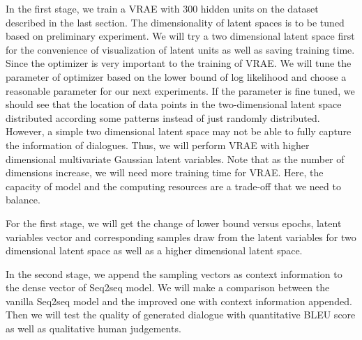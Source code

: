 In the first stage, we train a VRAE with 300 hidden units on the dataset described in the last section. The dimensionality of latent spaces is to be tuned based on preliminary experiment. We will try a two dimensional latent space first for the convenience of visualization of latent units as well as saving training time. Since the optimizer is very important to the training of VRAE. We will tune the parameter of optimizer based on the lower bound of log likelihood and choose a reasonable parameter for our next experiments. If the parameter is fine tuned, we should see that the location of data points in the two-dimensional latent space distributed according some patterns instead of just randomly distributed. However, a simple two dimensional latent space may not be able to fully capture the information of dialogues. Thus, we will perform VRAE with higher dimensional multivariate Gaussian latent variables. Note that as the number of dimensions increase, we will need more training time for VRAE. Here, the capacity of model and the computing resources are a trade-off that we need to balance.

For the first stage, we will get the change of lower bound versus epochs, latent variables vector and corresponding samples draw from the latent variables for two dimensional latent space as well as a higher dimensional latent space.

In the second stage, we append the sampling vectors as context information to the dense vector of Seq2seq model. We will make a comparison between the vanilla Seq2seq model and the improved one with context information appended. Then we will test the quality of generated dialogue with quantitative BLEU score as well as qualitative human judgements.